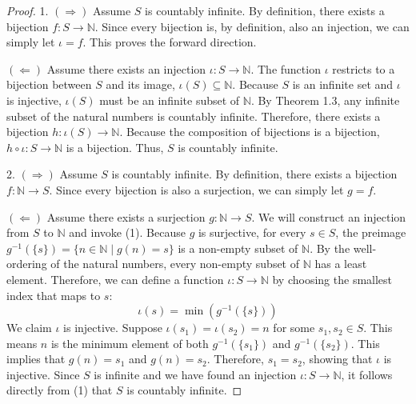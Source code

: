 \documentclass[../analysis1.tex]{subfiles}
\begin{document}
\begin{proof}

    1. $(\Rightarrow)$ Assume $S$ is countably infinite. By definition, there exists a bijection $f : S \to \mathbb{N}$. Since every bijection is, by definition, also an injection, we can simply let $\iota = f$. This proves the forward direction.

    $(\Leftarrow)$ Assume there exists an injection $\iota : S \to \mathbb{N}$. The function $\iota$ restricts to a bijection between $S$ and its image, $\iota(S) \subseteq \mathbb{N}$. Because $S$ is an infinite set and $\iota$ is injective, $\iota(S)$ must be an infinite subset of $\mathbb{N}$. By Theorem 1.3, any infinite subset of the natural numbers is countably infinite. Therefore, there exists a bijection $h : \iota(S) \to \mathbb{N}$. Because the composition of bijections is a bijection, $h \circ \iota : S \to \mathbb{N}$ is a bijection. Thus, $S$ is countably infinite.

    2. $(\Rightarrow)$ Assume $S$ is countably infinite. By definition, there exists a bijection $f : \mathbb{N} \to S$. Since every bijection is also a surjection, we can simply let $g = f$.

    $(\Leftarrow)$ Assume there exists a surjection $g : \mathbb{N} \to S$. We will construct an injection from $S$ to $\mathbb{N}$ and invoke (1). Because $g$ is surjective, for every $s \in S$, the preimage $g^{-1}(\{s\}) = \{n \in \mathbb{N} \mid g(n) = s\}$ is a non-empty subset of $\mathbb{N}$. By the well-ordering of the natural numbers, every non-empty subset of $\mathbb{N}$ has a least element. Therefore, we can define a function $\iota : S \to \mathbb{N}$ by choosing the smallest index that maps to $s$:
    \[ \iota(s) = \min(g^{-1}(\{s\})) \]
    We claim $\iota$ is injective. Suppose $\iota(s_1) = \iota(s_2) = n$ for some $s_1, s_2 \in S$. This means $n$ is the minimum element of both $g^{-1}(\{s_1\})$ and $g^{-1}(\{s_2\})$. This implies that $g(n) = s_1$ and $g(n) = s_2$. Therefore, $s_1 = s_2$, showing that $\iota$ is injective. Since $S$ is infinite and we have found an injection $\iota : S \to \mathbb{N}$, it follows directly from (1) that $S$ is countably infinite.\qedhere
\end{proof}
\end{document}
